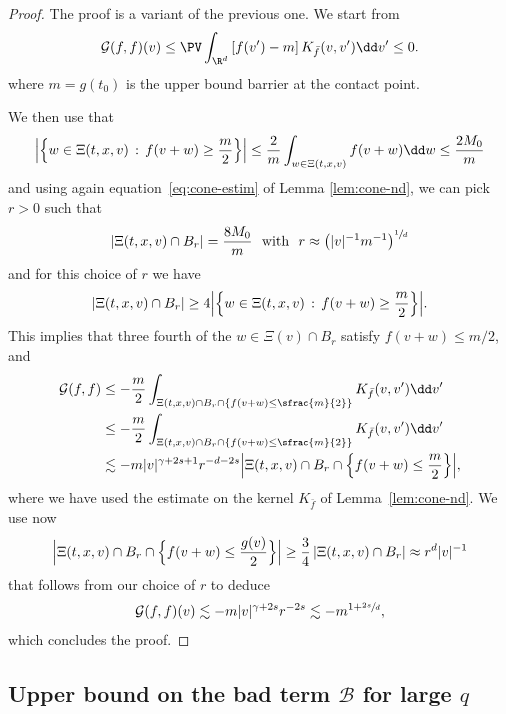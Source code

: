 \begin{proof}
The proof is a variant of the previous one. We start from
\begin{equation*}
\mathcal{G}(f,f)(v) \le \PV \int_{\R^d} \left[f(v')-m\right] K_{\bar f}(v,v') \dd
v' \le 0.
\end{equation*}
where $m=g(t_0)$ is the upper bound barrier at the contact point.

We then use that
\[
\Bigl|\Bigl\{ w \in \Xi(t,x,v) \, : \, f(v+w) \ge \frac{m}{2}
\Bigr\}\Bigr| \le \frac2{m} \int_{w \in \Xi(t,x,v)} f(v+w) \dd w \le
\frac{2M_0}{m}
\]
and using again equation~\eqref{eq:cone-estim} of Lemma
\ref{lem:cone-nd}, we can pick $r>0$ such that
\[
\left|\Xi(t,x,v) \cap B_r \right| = \frac{8M_0}{m} \ \mbox{ with } \ r \approx
\left(|v|^{-1} m^{-1}\right)^{\sfrac1d}
\]
and for this choice of $r$ we have
\[
\left|\Xi(t,x,v) \cap B_r \right| \ge 4 \Bigl|\Bigl\{ w \in \Xi(t,x,v) \, :
\, f(v+w) \ge \frac{m}{2} \Bigr\}\Bigr|.
\]
This implies that three fourth of the $w \in \Xi(v) \cap B_r$ satisfy
$ f(v+w) \le m/2$, and
\begin{align*}
\mathcal G(f,f) & \leq - \frac{m}{2} \int_{\Xi(t,x,v) \cap B_r \cap \left\{f(v+w) \le \sfrac{m}{2}\right\}}
K_{\bar f}(v,v') \dd v' \\
&\leq -\frac{m}{2} \int_{\Xi(t,x,v) \cap B_r \cap \left\{f(v+w) \le \sfrac{m}{2}\right\} } K_{\bar f}(v,v') \dd v' \\
&\lesssim - m |v|^{\gamma+2s+1} r^{-d-2s} \Bigl|\Xi(t,x,v) \cap B_r \cap
\Bigl\{f(v+w) \le \frac{m}{2}\Bigr\}\Bigr|,
\end{align*}
where we have used the estimate on the kernel $K_{\bar f}$ of
Lemma~\ref{lem:cone-nd}. We use now
\[
\Bigl|\Xi(t,x,v) \cap B_r \cap \Bigl\{f(v+w) \le \frac{g(v)}{2} \Bigr\}\Bigr| \ge \frac34\, |\Xi(t,x,v) \cap
B_r| \approx r^d |v|^{-1}
\]
that follows from our choice of $r$ to deduce
\begin{align*}
\mathcal G(f,f)(v) \lesssim - m |v|^{\gamma+2s} r^{-2s} \lesssim
- m^{1+\sfrac{2s}{d}},
\end{align*}
which concludes the proof.
\end{proof}

\subsection{Upper bound on the bad term $\mathcal B$ for large $q$}

